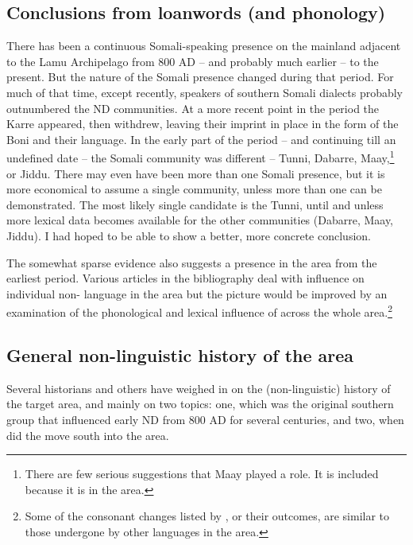 \documentclass[output=paper
,newtxmath
,modfonts
,nonflat]{langsci/langscibook}
\begin{document}
\subsection{Conclusions from loanwords (and phonology)}\label{sec:nurse:5.5} There has been a continuous Somali-speaking presence on the mainland adjacent to the Lamu Archipelago from 800 AD – and probably much earlier – to the present. But the nature of the Somali presence changed during that period. For much of that time, except recently, speakers of southern Somali dialects probably outnumbered the ND communities. At a more recent point in the period the Karre appeared, then withdrew, leaving their imprint in place in the form of the Boni and their language. In the early part of the period – and continuing till an undefined date -- the Somali community was different – Tunni, Dabarre, Maay,\footnote{There are few serious suggestions that Maay played a role. It is included because it is in the area.}  or Jiddu. There may even have been more than one Somali presence, but it is more economical to assume a single community, unless more than one can be demonstrated. The most likely single candidate is the Tunni, until and unless more lexical data becomes available for the other communities (Dabarre, Maay, Jiddu). I had hoped to be able to show a better, more concrete conclusion.

The somewhat sparse evidence also suggests a  presence in the area from the earliest period. Various articles in the bibliography deal with  influence on individual non- language in the area but the picture would be improved by an examination of the phonological and lexical influence of  across the whole area.\footnote{Some of the consonant changes listed by \citet[115-26]{Ehret1980}, or their outcomes, are similar to those undergone by other languages in the area.}  

\subsection{General non-linguistic history of the area} Several historians and others have weighed in on the (non-linguistic) history of the target area, and mainly on two topics: one, which was the original southern  group that influenced early ND from 800 AD for several centuries, and two, when did the  move south into the area.
\end{document}
